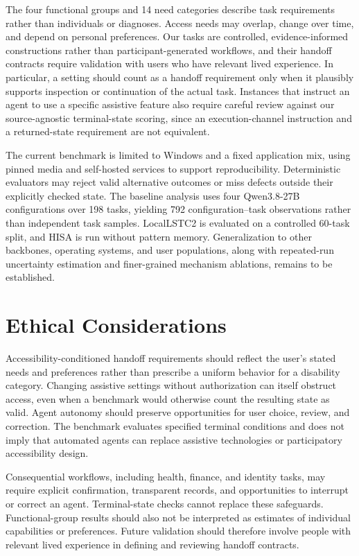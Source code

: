 \documentclass[11pt]{article}
\begin{document}
The four functional groups and 14 need categories describe task requirements rather than individuals or diagnoses. Access needs may overlap, change over time, and depend on personal preferences. Our tasks are controlled, evidence-informed constructions rather than participant-generated workflows, and their handoff contracts require validation with users who have relevant lived experience. In particular, a setting should count as a handoff requirement only when it plausibly supports inspection or continuation of the actual task. Instances that instruct an agent to use a specific assistive feature also require careful review against our source-agnostic terminal-state scoring, since an execution-channel instruction and a returned-state requirement are not equivalent.

The current benchmark is limited to Windows and a fixed application mix, using pinned media and self-hosted services to support reproducibility. Deterministic evaluators may reject valid alternative outcomes or miss defects outside their explicitly checked state. The baseline analysis uses four Qwen3.8-27B configurations over 198 tasks, yielding 792 configuration--task observations rather than independent task samples. LocalLSTC2 is evaluated on a controlled 60-task split, and HISA is run without pattern memory. Generalization to other backbones, operating systems, and user populations, along with repeated-run uncertainty estimation and finer-grained mechanism ablations, remains to be established.


\section{Ethical Considerations}

Accessibility-conditioned handoff requirements should reflect the user's stated needs and preferences rather than prescribe a uniform behavior for a disability category. Changing assistive settings without authorization can itself obstruct access, even when a benchmark would otherwise count the resulting state as valid. Agent autonomy should preserve opportunities for user choice, review, and correction. The benchmark evaluates specified terminal conditions and does not imply that automated agents can replace assistive technologies or participatory accessibility design.

Consequential workflows, including health, finance, and identity tasks, may require explicit confirmation, transparent records, and opportunities to interrupt or correct an agent. Terminal-state checks cannot replace these safeguards. Functional-group results should also not be interpreted as estimates of individual capabilities or preferences. Future validation should therefore involve people with relevant lived experience in defining and reviewing handoff contracts.
\end{document}
